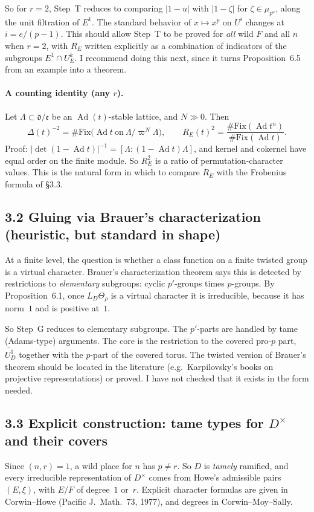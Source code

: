 \documentclass[11pt]{article}
\newcommand{\Ad}{\operatorname{Ad}}
\theoremstyle{plain}
\begin{document}
So for $r=2$, Step~T reduces to comparing $|1-u|$ with $|1-\zeta|$ for
$\zeta\in\mu_{p^a}$, along the unit filtration of $E^1$. The standard
behavior of $x\mapsto x^p$ on $U^i$ changes at $i=e/(p-1)$. This should
allow Step~T to be proved for \emph{all} wild $F$ and all $n$ when
$r=2$, with $R_E$ written explicitly as a combination of indicators of
the subgroups $E^1\cap U_E^k$. I recommend doing this next, since it
turns Proposition~6.5 from an example into a theorem.

\paragraph{A counting identity (any $r$).} Let $\Lambda\subset\mathfrak
d/\mathfrak e$ be an $\Ad(t)$-stable lattice, and $N\gg0$. Then
\[
\Delta(t)^{-2}=\#\mathrm{Fix}\bigl(\Ad t\ \text{on}\ \Lambda/\varpi^N\Lambda\bigr),
\qquad
R_E(t)^2=\frac{\#\mathrm{Fix}(\Ad t^n)}{\#\mathrm{Fix}(\Ad t)}.
\]
Proof: $|\det(1-\Ad t)|^{-1}=[\Lambda:(1-\Ad t)\Lambda]$, and kernel and
cokernel have equal order on the finite module. So $R_E^2$ is a ratio
of permutation-character values. This is the natural form in which to
compare $R_E$ with the Frobenius formula of \S3.3.

\subsection*{3.2 Gluing via Brauer's characterization (heuristic, but standard in shape)}
At a finite level, the question is whether a class function on a finite
twisted group is a virtual character. Brauer's characterization theorem
says this is detected by restrictions to \emph{elementary} subgroups:
cyclic $p'$-groups times $p$-groups. By Proposition~6.1, once
$L_D\Theta_\rho$ is a virtual character it is irreducible, because it
has norm~$1$ and is positive at~$1$.

So Step~G reduces to elementary subgroups. The $p'$-parts are handled
by tame (Adams-type) arguments. The core is the restriction to the
covered pro-$p$ part, $\widetilde{U_D^1}$ together with the $p$-part of
the covered torus. The twisted version of Brauer's theorem should be
located in the literature (e.g.\ Karpilovsky's books on projective
representations) or proved. I have not checked that it exists in the
form needed.

\subsection*{3.3 Explicit construction: tame types for $D^\times$ and their covers}
Since $(n,r)=1$, a wild place for $n$ has $p\ne r$. So $D$ is
\emph{tamely} ramified, and every irreducible representation of
$D^\times$ comes from Howe's admissible pairs $(E,\xi)$, with $E/F$ of
degree~$1$ or~$r$. Explicit character formulas are given in Corwin--Howe
(Pacific J.\ Math.\ 73, 1977), and degrees in Corwin--Moy--Sally.
\end{document}
